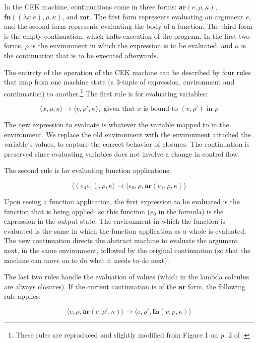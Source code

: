 \documentclass{article}
\begin{document}
In the CEK machine, continuations come in three forms: $\textbf{ar}(e, \rho, \kappa)$, $\textbf{fn}((\lambda x.e), \rho, \kappa)$, and $\textbf{mt}$. The first form represents evaluating an argument $e$, and the second form represents evaluating the body of a function. The third form is the empty continuation, which halts execution of the program. In the first two forms, $\rho$ is the environment in which the expression is to be evaluated, and $\kappa$ is the continuation that is to be executed afterwards.

The entirety of the operation of the CEK machine can be described by four rules that map from one machine state (a 3-tuple of expression, environment and continuation) to another.\footnote{These rules are reproduced and slightly modified from Figure 1 on p. 2 of \cite{aam}.} The first rule is for evaluating variables:

$$ \langle x, \rho, \kappa \rangle \to \langle v, \rho', \kappa \rangle, \text{ given that $x$ is bound to $(v, \rho')$ in $\rho$} $$

The new expression to evaluate is whatever the variable mapped to in the environment. We replace the old environment with the environment attached the variable's values, to capture the correct behavior of closures. The continuation is preserved since evaluating variables does not involve a change in control flow.

The second rule is for evaluating function applications:

$$ \langle (e_0 e_1), \rho, \kappa \rangle \to \langle e_0, \rho, \textbf{ar}(e_1, \rho, \kappa) \rangle $$

Upon seeing a function application, the first expression to be evaluated is the function that is being applied, so this function ($e_0$ in the formula) is the expression in the output state. The environment in which the function is evaluated is the same in which the function application as a whole is evaluated. The new continuation directs the abstract machine to evaluate the argument next, in the same environment, followed by the original continuation (so that the machine can move on to do what it needs to do next).

The last two rules handle the evaluation of values (which in the lambda calculus are always closures). If the current continuation is of the \textbf{ar} form, the following rule applies:

$$ \langle v, \rho, \textbf{ar}(e, \rho', \kappa) \rangle \to \langle e, \rho', \textbf{fn}(v, \rho, \kappa) \rangle $$
\end{document}
